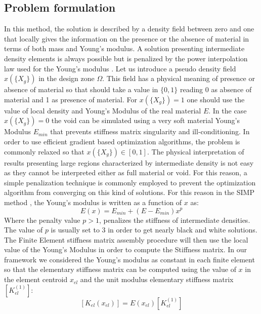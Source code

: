 \subsection{Problem formulation}
In this method, the solution is described by a density field between zero and one that locally gives the information on the presence or the absence of material in terms of both mass and Young's modulus. 
A solution presenting intermediate density elements is always possible but is penalized by the power interpolation law used for the Young's modulus \cite{bendsoe1989optimal}.  Let us introduce a pseudo density field $x(\lbrace X_g \rbrace)$ in the design zone $\Omega$. This field has a physical meaning of presence or absence of material so that should take a value in $\{0,1\}$ reading 0 as absence of material and 1 as presence of material. For $x(\lbrace X_g \rbrace)=1$ one should use the value of local density and Young's Modulus of the real material $E$. In the case $x(\lbrace X_g \rbrace)=0$ the void can be simulated using a very soft material Young's Modulus $E_{min}$ that prevents stiffness matrix singularity and ill-conditioning. 
In order to use efficient gradient based optimization algorithms, the problem is commonly relaxed so that $x(\lbrace X_g \rbrace)\in [0,1]$. The physical interpretation of results presenting large regions characterized by intermediate density is not easy as they cannot be interpreted either as full material or void. For this reason, a simple penalization technique is commonly employed to prevent the optimization algorithm from converging on this kind of solutions. For this reason in the SIMP method \cite{bendsoe1989optimal}, the Young's modulus is written as a function of $x$ as:
\begin{equation}
\label{eq.6}
E(x)=E_{min}+(E-E_{min})x^p
\end{equation}
Where the penalty value $p>1$, penalizes the stiffness of intermediate densities.
The value of $p$ is usually set to 3 in order to get nearly black and white solutions. 
The Finite Element stiffness matrix assembly procedure will then use the local value of the Young's Modulus in order to compute the Stiffness matrix. In our framework we considered the Young's modulus as constant in each finite element so that the elementary stiffness matrix can be computed using the value of $x$ in the element centroid $x_{el}$ and the unit modulus elementary stiffness matrix $\left[K_{el}^{(1)}\right]$:
\begin{equation}
\label{eq.7}
\left[K_{el}(x_{el})\right]=E(x_{el})\left[K_{el}^{(1)}\right]
\end{equation}
